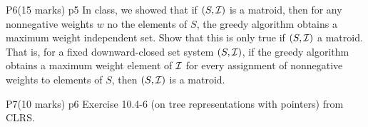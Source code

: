 \documentclass[a4paper, 11pt]{article}
\begin{document}

\begin{problem}{%
	P6\hfill  (15 marks)
}{p5%
}
In class, we showed that if $(S,\mathcal{I})$ is a matroid, then for any nonnegative weights $w$ no the  elements of $S$, the greedy algorithm obtains a maximum weight independent set. Show that this is only true if $(S,\mathcal{I})$ a matroid. That is, for a fixed downward-closed set system $(S,\mathcal{I})$, if the greedy algorithm obtains a maximum weight element of $\mathcal{I}$ for every assignment of nonnegative weights to elements of $S$, then $(S,\mathcal{I})$ is a matroid.
\end{problem}
\solve{ 
}



\begin{problem}{%
	P7\hfill  (10 marks)
}{p6%
}
Exercise 10.4-6 (on tree representations with pointers) from CLRS.

\end{problem}
\solve{
}


\end{document}
